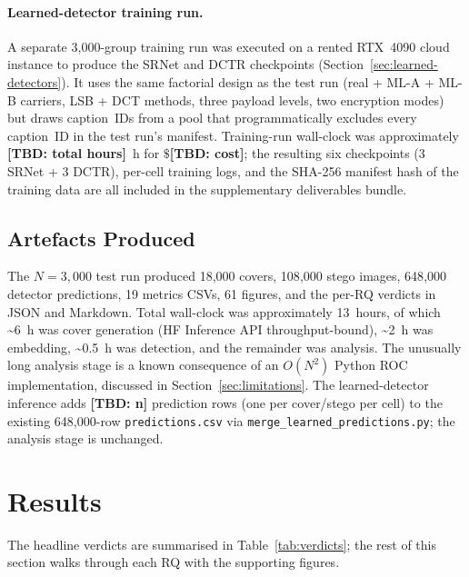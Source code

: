 \documentclass[10pt,twocolumn,a4paper]{article}
\newcommand{\TBD}[1]{\textbf{\color{red}[TBD: #1]}}
\begin{document}
\paragraph{Learned-detector training run.} A separate 3{,}000-group training run was executed on a rented RTX~4090 cloud instance to produce the SRNet and DCTR checkpoints (Section~\ref{sec:learned-detectors}). It uses the same factorial design as the test run (real + ML-A + ML-B carriers, LSB + DCT methods, three payload levels, two encryption modes) but draws caption~IDs from a pool that programmatically excludes every caption~ID in the test run's manifest. Training-run wall-clock was approximately \TBD{total hours}~h for $\$$\TBD{cost}; the resulting six checkpoints (3 SRNet + 3 DCTR), per-cell training logs, and the SHA-256 manifest hash of the training data are all included in the supplementary deliverables bundle.

\subsection{Artefacts Produced}
The $N\!=\!3{,}000$ test run produced 18{,}000 covers, 108{,}000 stego images, 648{,}000 detector predictions, 19 metrics CSVs, 61 figures, and the per-RQ verdicts in JSON and Markdown. Total wall-clock was approximately 13~hours, of which \textasciitilde6~h was cover generation (HF Inference API throughput-bound), \textasciitilde2~h was embedding, \textasciitilde0.5~h was detection, and the remainder was analysis. The unusually long analysis stage is a known consequence of an $O(N^2)$ Python ROC implementation, discussed in Section~\ref{sec:limitations}. The learned-detector inference adds \TBD{n} prediction rows (one per cover/stego per cell) to the existing 648{,}000-row \texttt{predictions.csv} via \texttt{merge\_learned\_predictions.py}; the analysis stage is unchanged.

\section{Results}
\label{sec:results}

The headline verdicts are summarised in Table~\ref{tab:verdicts}; the rest of this section walks through each RQ with the supporting figures.
\end{document}
